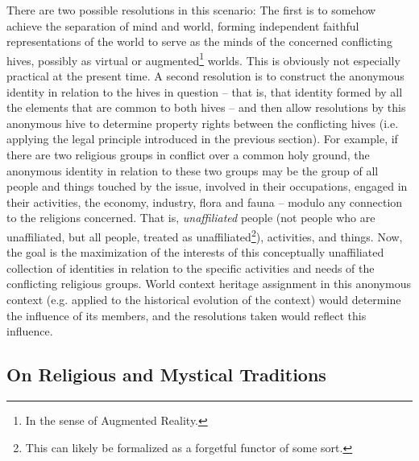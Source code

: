 \documentclass[pra,twocolumn,groupedaddress,10pt]{revtex4}
\theoremstyle{definition}
\begin{document}
There are two possible resolutions in this scenario: The first is to somehow achieve the separation of mind and world, forming independent faithful representations of the world to serve as the minds of the concerned conflicting hives, possibly as virtual or augmented\footnote{In the sense of Augmented Reality.} worlds. This is obviously not especially practical at the present time. A second resolution is to construct the anonymous identity in relation to the hives in question -- that is, that identity formed by all the elements that are common to both hives -- and then allow resolutions by this anonymous hive to determine property rights between the conflicting hives (i.e. applying the legal principle introduced in the previous section). For example, if there are two religious groups in conflict over a common holy ground, the anonymous identity in relation to these two groups may be the group of all people and things touched by the issue, involved in their occupations, engaged in their activities, the economy, industry, flora and fauna -- modulo any connection to the religions concerned. That is, \textit{unaffiliated} people (not people who are unaffiliated, but all people, treated as unaffiliated\footnote{This can likely be formalized as a forgetful functor of some sort.}), activities, and things. Now, the goal is the maximization of the interests of this conceptually unaffiliated collection of identities in relation to the specific activities and needs of the conflicting religious groups. World context heritage assignment in this anonymous context (e.g. applied to the historical evolution of the context) would determine the influence of its members, and the resolutions taken would reflect this influence.


\subsection{On Religious and Mystical Traditions} \label{sec:phirelhistra}
\end{document}
